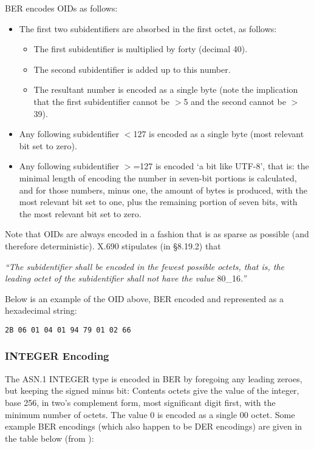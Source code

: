 BER encodes OIDs as follows:
\begin{itemize}
    \item The first two subidentifiers are absorbed in the first octet, as 
follows:
    \begin{itemize}
        \item The first subidentifier is multiplied by forty (decimal 40).
        \item The second subidentifier is added up to this number.
        \item The resultant number is encoded as a single byte (note the 
implication that the first subidentifier cannot be $>$5 and the second 
cannot be $>$39).
    \end{itemize}
    \item Any following subidentifier $<$127 is encoded as a single byte (most 
relevant bit set to zero).
    \item Any following subidentifier $>$=127 is encoded ‘a bit like 
UTF-8’, that is: the minimal length of encoding the number in seven-bit 
portions is calculated, and for those numbers, minus one, the amount of 
bytes is produced, with the most relevant bit set to one, plus the 
remaining portion of seven bits, with the most relevant bit set to zero.
\end{itemize}

Note that OIDs are always encoded in a fashion that is as sparse as 
possible (and therefore deterministic). X.690 \cite{bib:x690} stipulates (in 
§8.19.2) that

\textit{“The subidentifier shall be encoded in the fewest 
possible octets, that is, the leading octet of the subidentifier shall not 
have the value }80_{16}\textit{.”}

Below is an example of the OID above, BER encoded and represented as
a hexadecimal string:

\begin{changemargin}{-60mm}{0mm}
\begin{myquote}
\begin{verbatim}
2B 06 01 04 01 94 79 01 02 66
\end{verbatim}
\end{myquote}
\end{changemargin}

\subsubsection{INTEGER Encoding}

The ASN.1 INTEGER type is encoded in BER by foregoing any leading zeroes, 
but keeping the signed minus bit:
Contents octets give the value of the integer, base 256, in two's 
complement form, most significant digit first, with the minimum number of 
octets. The value 0 is encoded as a single 00 octet. 
Some example BER encodings (which also happen to be DER encodings) are 
given in the table below (from \cite{bib:ber}):

